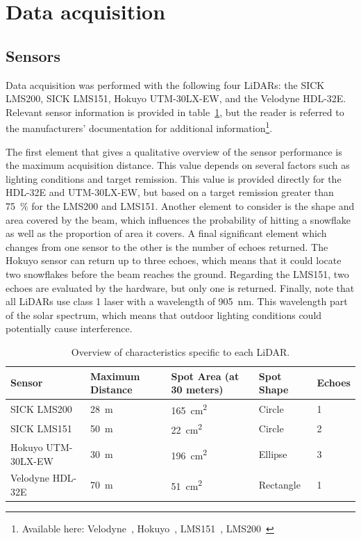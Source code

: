 \section{Data acquisition}

\subsection{Sensors}

Data acquisition was performed with the following four LiDARs: the SICK LMS200, SICK LMS151, Hokuyo UTM-30LX-EW, and the Velodyne HDL-32E. Relevant sensor information is provided in table~\ref{tab:lidars}, but the reader is referred to the manufacturers' documentation for additional information\footnote{Available here: Velodyne~\cite{VelodyneManual}, Hokuyo~\cite{UTMDatasheet}, LMS151~\cite{LMS151Datasheet}, LMS200~\cite{LMS200Manual}}. 

The first element that gives a qualitative overview of the sensor performance is the maximum acquisition distance. This value depends on several factors such as lighting conditions and target remission. This value is provided directly for the HDL-32E and UTM-30LX-EW, but based on a target remission greater than \SI{75}{\percent} for the LMS200 and LMS151. Another element to consider is the shape and area covered by the beam, which influences the probability of hitting a snowflake as well as the proportion of area it covers. A final significant element which changes from one sensor to the other is the number of echoes returned. The Hokuyo sensor can return up to three echoes, which means that it could locate two snowflakes before the beam reaches the ground. Regarding the LMS151, two echoes are evaluated by the hardware, but only one is returned. Finally, note that all LiDARs use class 1 laser with a wavelength of \SI{905}{\nano\meter}. This wavelength part of the solar spectrum, which means that outdoor lighting conditions could potentially cause interference.

\begin{table}[htbp]
    \centering
    \begin{tabularx}{\linewidth}{|X|X|X|X|X|}\hline
        \textbf{Sensor}     & \textbf{Maximum Distance}  & \textbf{Spot Area (at 30 meters)}  & \textbf{Spot Shape} & \textbf{Echoes} \\ \hline
        SICK LMS200         & \SI{28}{\meter}            & \SI{165}{\centi\meter\squared}     & Circle              & 1               \\ \hline
        SICK LMS151         & \SI{50}{\meter}            & \SI{22}{\centi\meter\squared}      & Circle              & 2               \\ \hline
        Hokuyo UTM-30LX-EW  & \SI{30}{\meter}            & \SI{196}{\centi\meter\squared}     & Ellipse             & 3               \\ \hline
        Velodyne HDL-32E    & \SI{70}{\meter}            & \SI{51}{\centi\meter\squared}      & Rectangle           & 1               \\ \hline
    \end{tabularx}
    \caption{Overview of characteristics specific to each LiDAR.}\label{tab:lidars}
\end{table}

